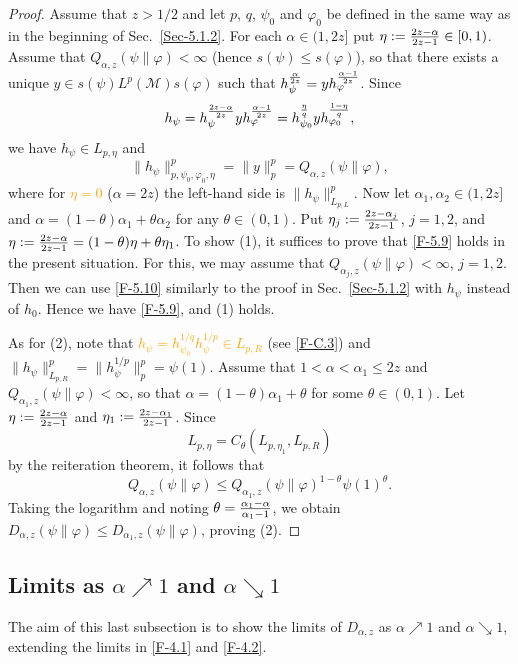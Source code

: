 \documentclass[12pt]{article}
\theoremstyle{definition}
\theoremstyle{remark}
\numberwithin{equation}{section}
\def\Me{\mathcal M}
\def\ffi{\varphi}
\begin{document}
\begin{proof}
Assume that $z>1/2$ and 
let $p$, $q$, $\psi_0$ and $\ffi_0$ be defined in the same way as in the beginning
of Sec.~\ref{Sec-5.1.2}. For each $\alpha\in(1,2z]$ put $\eta:={2z-\alpha\over2z-1}\in[0,1)$. Assume that
$Q_{\alpha,z}(\psi\|\ffi)<\infty$ (hence $s(\psi)\le s(\ffi)$), so that there exists a unique
$y\in s(\psi)L^p(\Me)s(\ffi)$ such that $h_\psi^{\alpha\over2z}=yh_\ffi^{\alpha-1\over2z}$. Since
\[
h_\psi=h_\psi^{2z-\alpha\over2z}yh_\ffi^{\alpha-1\over2z}
=h_{\psi_0}^{\eta\over q}yh_{\ffi_0}^{1-\eta\over q},
\]
we have $h_\psi\in L_{p,\eta}$ and
\[
\|h_\psi\|_{p,\psi_0,\ffi_0,\eta}^p=\|y\|_p^p=Q_{\alpha,z}(\psi\|\ffi),
\]
where for \textcolor{orange}{$\eta=0$} ($\alpha=2z$) the left-hand side is $\|h_\psi\|_{L_{p,L}}^p$. Now let
$\alpha_1,\alpha_2\in(1,2z]$ and $\alpha=(1-\theta)\alpha_1+\theta\alpha_2$ for any $\theta\in(0,1)$.
Put $\eta_j:={2z-\alpha_j\over2z-1}$, $j=1,2$, and $\eta:={2z-\alpha\over2z-1}=(1-\theta)\eta+\theta\eta_1$.
To show (1), it suffices to prove that \eqref{F-5.9} holds in the present situation. For this, we may assume
that $Q_{\alpha_j,z}(\psi\|\ffi)<\infty$, $j=1,2$. Then we can use \eqref{F-5.10} similarly to the proof in
Sec.~\ref{Sec-5.1.2} with $h_\psi$ instead of $h_0$. Hence we have \eqref{F-5.9}, and (1) holds.

As for (2), note that \textcolor{orange}{$h_\psi=h_{\psi_0}^{1/q}h_\psi^{1/p}\in
L_{p,R}$} (see \eqref{F-C.3}) and
$\|h_\psi\|_{L_{p,R}}^p=\|h_\psi^{1/p}\|_p^p=\psi(1)$. Assume that $1<\alpha<\alpha_1\le2z$ and
$Q_{\alpha_1,z}(\psi\|\ffi)<\infty$, so that $\alpha=(1-\theta)\alpha_1+\theta$ for some $\theta\in(0,1)$.
Let $\eta:={2z-\alpha\over2z-1}$ and $\eta_1:={2z-\alpha_1\over2z-1}$. Since
\[
L_{p,\eta}=C_\theta(L_{p,\eta_1},L_{p,R})
\]
by the reiteration theorem, it follows that
\[
Q_{\alpha,z}(\psi\|\ffi)\le Q_{\alpha_1,z}(\psi\|\ffi)^{1-\theta}\psi(1)^\theta.
\]
Taking the logarithm and noting $\theta={\alpha_1-\alpha\over\alpha_1-1}$, we obtain
$D_{\alpha,z}(\psi\|\ffi)\le D_{\alpha_1,z}(\psi\|\ffi)$, proving (2).
\end{proof}


\subsection{Limits as $\alpha\nearrow1$ and $\alpha\searrow1$}

The aim of this last subsection is to show the limits of $D_{\alpha,z}$ as $\alpha\nearrow1$ and
$\alpha\searrow1$, extending the limits in \eqref{F-4.1} and \eqref{F-4.2}.
\end{document}

